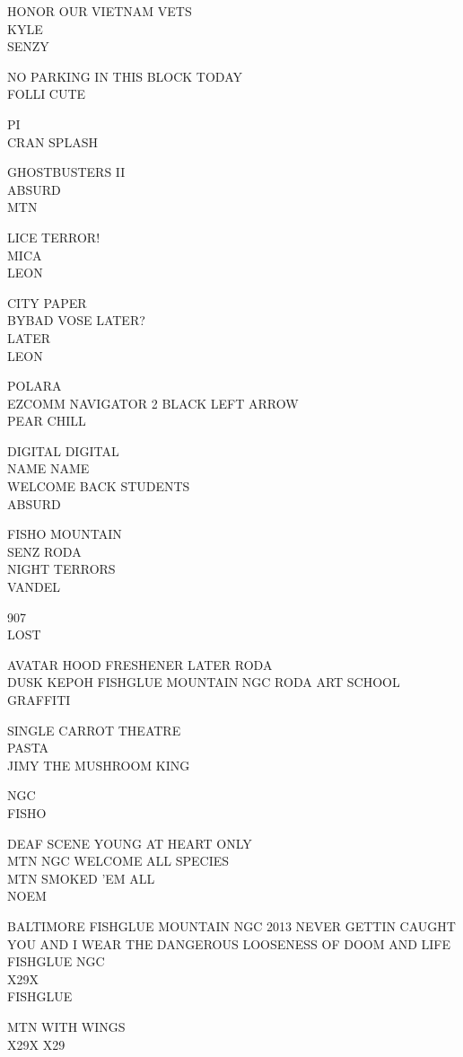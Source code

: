 \documentclass[10pt,letterpaper]{article}
\begin{document}
HONOR OUR VIETNAM VETS\\
KYLE\\
SENZY

NO PARKING IN THIS BLOCK TODAY\\
FOLLI CUTE

PI\\
CRAN SPLASH

GHOSTBUSTERS II\\
ABSURD\\
MTN

LICE TERROR!\\
MICA\\
LEON

CITY PAPER\\
BYBAD VOSE LATER?\\
LATER\\
LEON

POLARA\\
EZCOMM NAVIGATOR 2 BLACK LEFT ARROW\\
PEAR CHILL

DIGITAL DIGITAL\\
NAME NAME\\
WELCOME BACK STUDENTS\\
ABSURD

FISHO MOUNTAIN\\
SENZ RODA\\
NIGHT TERRORS\\
VANDEL

907\\
LOST

AVATAR HOOD FRESHENER LATER RODA\\
DUSK KEPOH FISHGLUE MOUNTAIN NGC RODA ART SCHOOL GRAFFITI

SINGLE CARROT THEATRE\\
PASTA\\
JIMY THE MUSHROOM KING

NGC\\
FISHO

DEAF SCENE YOUNG AT HEART ONLY\\
MTN NGC WELCOME ALL SPECIES\\
MTN SMOKED 'EM ALL\\
NOEM

BALTIMORE FISHGLUE MOUNTAIN NGC 2013 NEVER GETTIN CAUGHT\\
YOU AND I WEAR THE DANGEROUS LOOSENESS OF DOOM AND LIFE FISHGLUE NGC\\
X29X\\
FISHGLUE

MTN WITH WINGS\\
X29X X29
\end{document}

